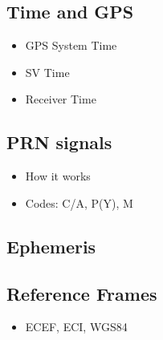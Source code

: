 \subsection{Time and GPS}
\begin{itemize}
\item GPS System Time
\item SV Time
\item Receiver Time
\end{itemize}
%
%
%
%

\subsection{PRN signals}
\begin{itemize}
\item How it works
\item Codes: C/A, P(Y), M
\end{itemize}

\subsection{Ephemeris}

\subsection{Reference Frames}
\begin{itemize}
\item ECEF, ECI, WGS84
\end{itemize}

